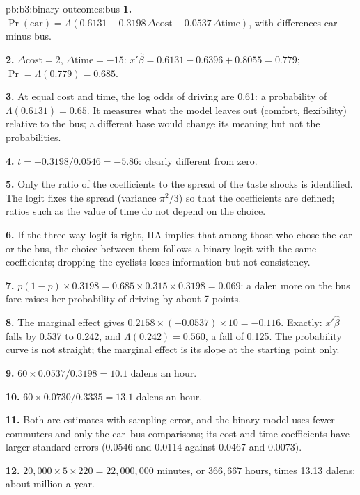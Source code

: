 \begin{solution}{pb:b3:binary-outcomes:bus}
\textbf{1.} $\Pr(\text{car}) = \Lambda(0.6131 - 0.3198\,\Delta\text{cost} -
0.0537\,\Delta\text{time})$, with differences car minus bus.

\textbf{2.} $\Delta\text{cost} = 2$, $\Delta\text{time} = -15$: $x'\hat\beta =
0.6131 - 0.6396 + 0.8055 = 0.779$; $\Pr = \Lambda(0.779) = 0.685$.

\textbf{3.} At equal cost and time, the log odds of driving are 0.61: a
probability of $\Lambda(0.6131) = 0.65$. It measures what the model leaves out
(comfort, flexibility) relative to the bus; a different base would change its
meaning but not the probabilities.

\textbf{4.} $t = -0.3198/0.0546 = -5.86$: clearly different from zero.

\textbf{5.} Only the ratio of the coefficients to the spread of the taste shocks
is identified. The logit fixes the spread (variance $\pi^2/3$) so that the
coefficients are defined; ratios such as the value of time do not depend on
the choice.

\textbf{6.} If the three-way logit is right, IIA implies that among those who
chose the car or the bus, the choice between them follows a binary logit with
the same coefficients; dropping the cyclists loses information but not
consistency.

\textbf{7.} $p(1 - p) \times 0.3198 = 0.685 \times 0.315 \times 0.3198 = 0.069$: a
dalen more on the bus fare raises her probability of driving by about 7 points.

\textbf{8.} The marginal effect gives $0.2158 \times (-0.0537) \times 10 =
-0.116$. Exactly: $x'\hat\beta$ falls by 0.537 to 0.242, and $\Lambda(0.242) = 0.560$,
a fall of 0.125. The probability curve is not straight; the marginal effect is
its slope at the starting point only.

\textbf{9.} $60 \times 0.0537/0.3198 = 10.1$ dalens an hour.

\textbf{10.} $60 \times 0.0730/0.3335 = 13.1$ dalens an hour.

\textbf{11.} Both are estimates with sampling error, and the binary model uses
fewer commuters and only the car--bus comparisons; its cost and time
coefficients have larger standard errors (0.0546 and 0.0114 against 0.0467
and 0.0073).

\textbf{12.} $20{,}000 \times 5 \times 220 = 22{,}000{,}000$ minutes, or
$366{,}667$ hours, times 13.13 dalens: about  million a year.


\end{solution}

